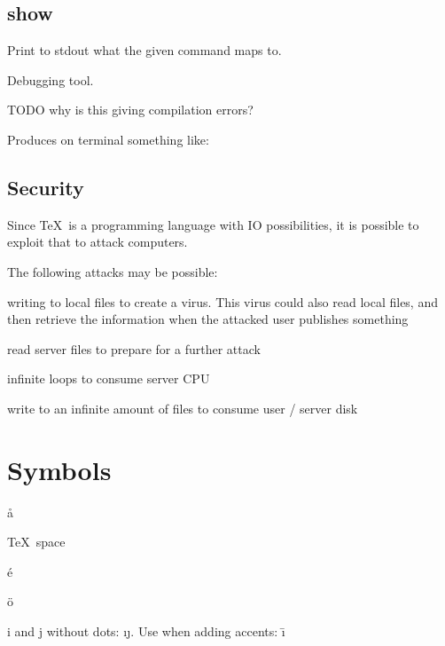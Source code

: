 
  \subsection{show}

    Print to stdout what the given command maps to.

    Debugging tool.

    TODO why is this giving compilation errors?


    Produces on terminal something like:



  \subsection{Security}

    Since \TeX\ is a programming language with IO possibilities, it is possible to exploit that to attack computers.

    The following attacks may be possible:

    \item{} writing to local files to create a virus. This virus could also read local files, and then retrieve the information when the attacked user publishes something

    \item{} read server files to prepare for a further attack

    \item{} infinite loops to consume server CPU

    \item{} write to an infinite amount of files to consume user / server disk

\section{Symbols}

  \aa

  \dag

  \TeX\ space

  \'e

  \"o

  i and j without dots: \i \j. Use when adding accents: \=\i

